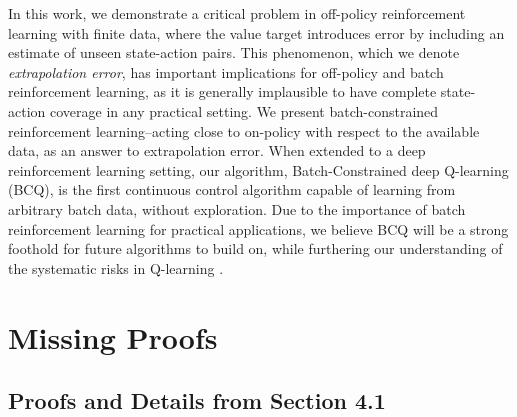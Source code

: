 \documentclass{article}
\begin{document}
In this work, we demonstrate a critical problem in off-policy reinforcement learning with finite data, where the value target introduces error by including an estimate of unseen state-action pairs. This phenomenon, which we denote \textit{\mbox{extrapolation} \mbox{error}}, has important implications for off-policy and batch reinforcement learning, as it is generally implausible to have complete state-action coverage in any practical setting. We present batch-constrained reinforcement learning--acting close to on-policy with respect to the available data, as an answer to extrapolation error. When extended to a deep reinforcement learning setting, our algorithm, Batch-Constrained deep Q-learning (BCQ), is the first continuous control algorithm capable of learning from arbitrary batch data, without exploration. Due to the importance of batch reinforcement learning for practical applications, we believe BCQ will be a strong foothold for future algorithms to build on, while furthering our understanding of the systematic risks in Q-learning \cite{thrun1993bias, lu2018delusional}.





\clearpage












\onecolumn
{}
\appendix

\section{Missing Proofs} \label{appendix:proofs}

\subsection{Proofs and Details from Section 4.1}
\end{document}

